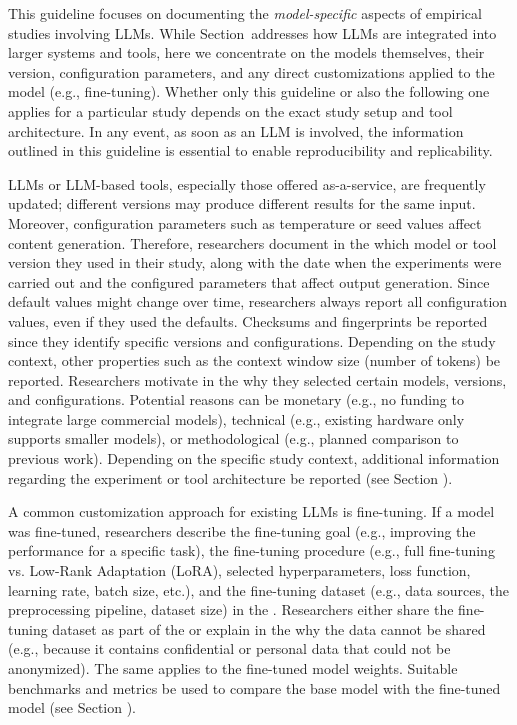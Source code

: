 This guideline focuses on documenting the \emph{model-specific} aspects of empirical studies involving LLMs.
While Section~\toolarchitecture addresses how LLMs are integrated into larger systems and tools, here we concentrate on the models themselves, their version, configuration parameters, and any direct customizations applied to the model (e.g., fine-tuning).
Whether only this guideline or also the following one applies for a particular study depends on the exact study setup and tool architecture.
In any event, as soon as an LLM is involved, the information outlined in this guideline is essential to enable reproducibility and replicability.


LLMs or LLM-based tools, especially those offered as-a-service, are frequently updated; different versions may produce different results for the same input.
Moreover, configuration parameters such as temperature or seed values affect content generation.
Therefore, researchers \must document in the \paper which model or tool version they used in their study, along with the date when the experiments were carried out and the configured parameters that affect output generation.
Since default values might change over time, researchers \should always report all configuration values, even if they used the defaults.
Checksums and fingerprints \may be reported since they identify specific versions and configurations.
Depending on the study context, other properties such as the context window size (number of tokens) \may be reported.
Researchers \should motivate in the \paper why they selected certain models, versions, and configurations.
Potential reasons can be monetary (e.g., no funding to integrate large commercial models), technical (e.g., existing hardware only supports smaller models), or methodological (e.g., planned comparison to previous work).
Depending on the specific study context, additional information regarding the experiment or tool architecture \should be reported (see Section \toolarchitecture).

A common customization approach for existing LLMs is fine-tuning.
If a model was fine-tuned, researchers \must describe the fine-tuning goal (e.g., improving the performance for a specific task), the fine-tuning procedure (e.g., full fine-tuning vs. Low-Rank Adaptation (LoRA), selected hyperparameters, loss function, learning rate, batch size, etc.), and the fine-tuning dataset (e.g., data sources, the preprocessing pipeline, dataset size) in the \paper.
Researchers \should either share the fine-tuning dataset as part of the \supplementarymaterial or explain in the \paper why the data cannot be shared (e.g., because it contains confidential or personal data that could not be anonymized).
The same applies to the fine-tuned model weights.
Suitable benchmarks and metrics \should be used to compare the base model with the fine-tuned model (see Section \benchmarksmetrics).

